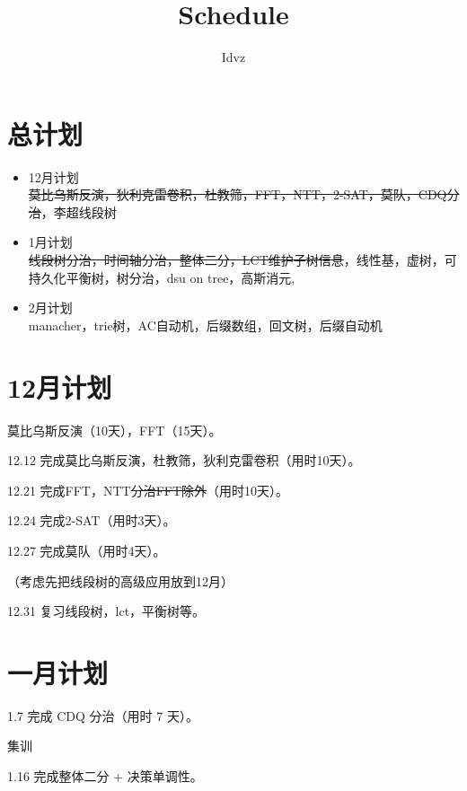 \documentclass{ctexart}
\title{Schedule}
\author{Idvz}
\begin{document}
\date{}
\maketitle





\section{总计划}
\begin{itemize}
\item 12月计划\\
  \sout{莫比乌斯反演，狄利克雷卷积，杜教筛，FFT，NTT，2-SAT，莫队，CDQ分治}，李超线段树
\item 1月计划\\
  \sout{线段树分治，时间轴分治，整体二分，LCT维护子树信息}，线性基，虚树，可持久化平衡树，树分治，dsu on tree，高斯消元,
\item 2月计划\\
  manacher，trie树，AC自动机，后缀数组，回文树，后缀自动机
\end{itemize}
  

\section{12月计划}

莫比乌斯反演（10天），FFT（15天）。

12.12 完成莫比乌斯反演，杜教筛，狄利克雷卷积（用时10天）。

12.21 完成FFT，NTT\sout{分治FFT除外}（用时10天）。

12.24 完成2-SAT（用时3天）。

12.27 完成莫队（用时4天）。

（考虑先把线段树的高级应用放到12月）

12.31 复习线段树，lct，平衡树等。

\section{一月计划}

1.7 完成 CDQ 分治（用时 7 天）。

集训

1.16 完成整体二分 + 决策单调性。
\end{document}
